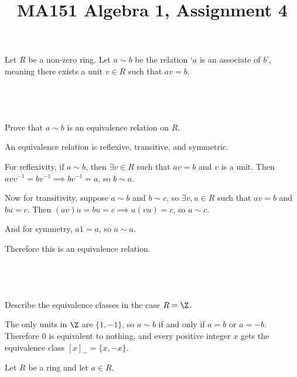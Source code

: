 \documentclass[a4paper]{article}
\title{MA151 Algebra 1, Assignment 4}
\begin{document}
\maketitle

\setlength{\parindent}{0em}
\setlength{\parskip}{1em}


\begin{questionbody}
Let $R$ be a non-zero ring. Let $a \sim b$ be the relation \enquote*{$a$ is an associate of $b$}, meaning there exists a unit $v \in R$ such that $av = b$.
\end{questionbody}

\subsection{~} %

\begin{questionbody}
Prove that $a \sim b$ is an equivalence relation on $R$.
\end{questionbody}

An equivalence relation is reflexive, transitive, and symmetric.

For reflexivity, if $a \sim b$, then $\exists v \in R$ such that $av = b$ and $v$ is a unit. Then $a v v^{-1} = b v^{-1} \implies b v^{-1} = a$, so $b \sim a$.

Now for transitivity, suppose $a \sim b$ and $b \sim c$, so $\exists v, u \in R$ such that $av = b$ and $bu = c$. Then $(av) u = bu = c \implies a (vu) = c$, so $a \sim c$.

And for symmetry, $a 1 = a$, so $a \sim a$.

Therefore this is an equivalence relation.

\subsection{~} %

\begin{questionbody}
Describe the equivalence classes in the case $R = \Z$.
\end{questionbody}

The only units in $\Z$ are $\{1, -1\}$, so $a \sim b$ if and only if $a = b$ or $a = -b$. Therefore $0$ is equivalent to nothing, and every positive integer $x$ gets the equivalence class $[x]_\sim = \{x, -x\}$.


\begin{questionbody}
Let $R$ be a ring and let $a \in R$.
\end{questionbody}
\end{document}
